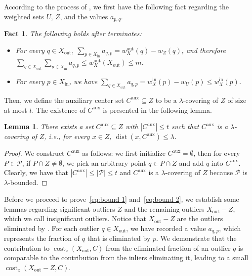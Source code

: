 \documentclass[letterpaper,11pt]{article}
\theoremstyle{plain}
\newtheorem{lemma}[theorem]{Lemma}
\newtheorem{fact}[theorem]{Fact}
\theoremstyle{definition}
\theoremstyle{remark}
\DeclareMathOperator{\cost}{cost}
\DeclareMathOperator{\dist}{dist}
\newcommand{\inl}{\mathrm{in}}
\newcommand{\out}{\mathrm{out}}
\newcommand{\calP}{\mathcal{P}}
\newcommand{\aux}{\mathrm{aux}}
\begin{document}
According to the process of , we first have the following fact regarding the weighted sets $U$, $Z$, and the values $a_{p,q}$.
\begin{fact}
    \label{fact:UZ}
    The following holds after  terminates:
    \begin{itemize}
        \item [1.] For every $q\in X_\out$, $\sum_{p\in X_\inl} a_{q,p} = w_X^\out(q) - w_Z(q)$, and therefore $\sum_{q\in X_\out}\sum_{p\in X_\inl} a_{q,p} \le w_X^\out(X_\out)\le m$.
        \item [2.] For every $p\in X_\inl$, we have $\sum_{q\in X_\out} a_{q,p} = w_X^\inl(p) - w_U(p)\le w_X^{\inl}(p)$. 
    \end{itemize}
\end{fact}

Then, we define the auxiliary center set $C^\aux\subseteq Z$ to be a $\lambda$-covering of $Z$ of size at most $t$. The existence of $C^\aux$ is presented in the following lemma.

\begin{lemma}
    \label{claim:bounded size of Caux}
    There exists a set $C^\aux\subseteq Z$ with $|C^\aux|\le t$ such that $C^\aux$ is a $\lambda$-covering of $Z$, i.e., for every $x\in Z$, $\dist(x,C^\aux)\le \lambda$.
\end{lemma}
\begin{proof}
    We construct $C^\aux$ as follows: we first initialize $C^\aux = \emptyset$, then for every $P\in \calP$, if $P\cap Z\neq\emptyset$, we pick an arbitrary point $q\in P\cap Z$ and add $q$ into $C^\aux$. Clearly, we have that $|C^\aux|\le |\calP|\le t$ and $C^\aux$ is a $\lambda$-covering of $Z$ because $\calP$ is $\lambda$-bounded.
\end{proof}







Before we proceed to prove~\eqref{eq:bound 1} and~\eqref{eq:bound 2}, we establish some lemmas regarding significant outliers $Z$ and the remaining outliers $X_\out - Z$, which we call insignificant outliers.
Notice that $X_\out-Z$ are the outliers eliminated by . For each outlier $q\in X_\out$, we have recorded a value $a_{q,p}$, which represents the fraction of $q$ that is eliminated by $p$. We demonstrate that the contribution to $\cost_z(X_\out,C)$ from the eliminated fraction of an outlier $q$ is comparable to the contribution from the inliers eliminating it, leading to a small $\cost_z(X_\out - Z,C)$.
\end{document}
